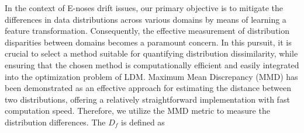 \documentclass[a4paper]{cas-sc}
\begin{document}
In the context of E-noses drift issues, our primary objective is to mitigate the differences in data distributions across various domains by means of learning a feature transformation. Consequently, the effective measurement of distribution disparities between domains becomes a paramount concern. In this pursuit, it is crucial to select a method suitable for quantifying distribution dissimilarity, while ensuring that the chosen method is computationally efficient and easily integrated into the optimization problem of LDM. Maximum Mean Discrepancy (MMD) has been demonstrated as an effective approach for estimating the distance between two distributions, offering a relatively straightforward implementation with fast computation speed. 
Therefore, we utilize the MMD metric to measure the distribution differences.
The $D_f$ is defined as
\end{document}
